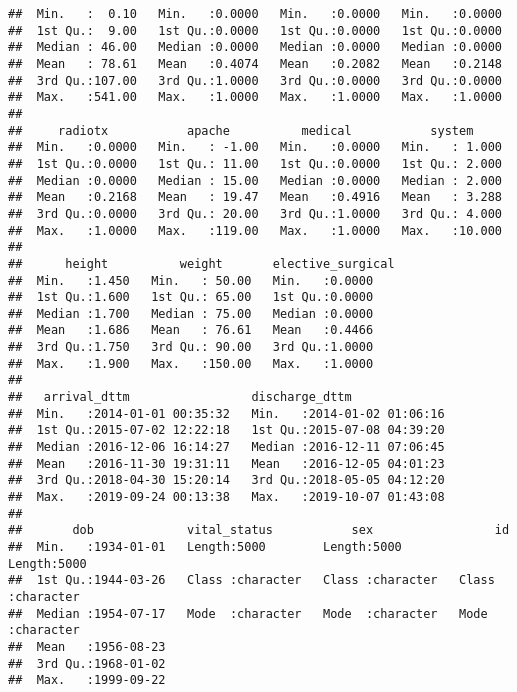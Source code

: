 \documentclass[
]{article}
\begin{document}
\begin{verbatim}
##  Min.   :  0.10   Min.   :0.0000   Min.   :0.0000   Min.   :0.0000  
##  1st Qu.:  9.00   1st Qu.:0.0000   1st Qu.:0.0000   1st Qu.:0.0000  
##  Median : 46.00   Median :0.0000   Median :0.0000   Median :0.0000  
##  Mean   : 78.61   Mean   :0.4074   Mean   :0.2082   Mean   :0.2148  
##  3rd Qu.:107.00   3rd Qu.:1.0000   3rd Qu.:0.0000   3rd Qu.:0.0000  
##  Max.   :541.00   Max.   :1.0000   Max.   :1.0000   Max.   :1.0000  
##                                                                     
##     radiotx           apache          medical           system      
##  Min.   :0.0000   Min.   : -1.00   Min.   :0.0000   Min.   : 1.000  
##  1st Qu.:0.0000   1st Qu.: 11.00   1st Qu.:0.0000   1st Qu.: 2.000  
##  Median :0.0000   Median : 15.00   Median :0.0000   Median : 2.000  
##  Mean   :0.2168   Mean   : 19.47   Mean   :0.4916   Mean   : 3.288  
##  3rd Qu.:0.0000   3rd Qu.: 20.00   3rd Qu.:1.0000   3rd Qu.: 4.000  
##  Max.   :1.0000   Max.   :119.00   Max.   :1.0000   Max.   :10.000  
##                                                                     
##      height          weight       elective_surgical
##  Min.   :1.450   Min.   : 50.00   Min.   :0.0000   
##  1st Qu.:1.600   1st Qu.: 65.00   1st Qu.:0.0000   
##  Median :1.700   Median : 75.00   Median :0.0000   
##  Mean   :1.686   Mean   : 76.61   Mean   :0.4466   
##  3rd Qu.:1.750   3rd Qu.: 90.00   3rd Qu.:1.0000   
##  Max.   :1.900   Max.   :150.00   Max.   :1.0000   
##                                                    
##   arrival_dttm                 discharge_dttm               
##  Min.   :2014-01-01 00:35:32   Min.   :2014-01-02 01:06:16  
##  1st Qu.:2015-07-02 12:22:18   1st Qu.:2015-07-08 04:39:20  
##  Median :2016-12-06 16:14:27   Median :2016-12-11 07:06:45  
##  Mean   :2016-11-30 19:31:11   Mean   :2016-12-05 04:01:23  
##  3rd Qu.:2018-04-30 15:20:14   3rd Qu.:2018-05-05 04:12:20  
##  Max.   :2019-09-24 00:13:38   Max.   :2019-10-07 01:43:08  
##                                                             
##       dob             vital_status           sex                 id           
##  Min.   :1934-01-01   Length:5000        Length:5000        Length:5000       
##  1st Qu.:1944-03-26   Class :character   Class :character   Class :character  
##  Median :1954-07-17   Mode  :character   Mode  :character   Mode  :character  
##  Mean   :1956-08-23                                                           
##  3rd Qu.:1968-01-02                                                           
##  Max.   :1999-09-22                                                           

\end{verbatim}
\end{document}
